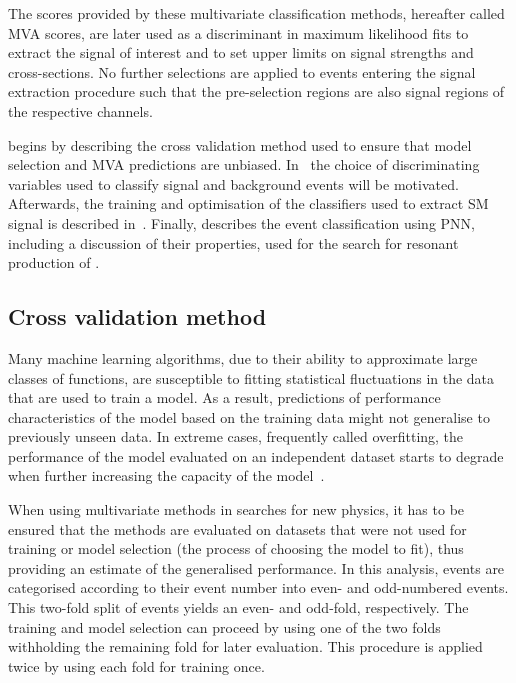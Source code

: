 The scores provided by these multivariate classification methods,
hereafter called MVA scores, are later used as a discriminant in
maximum likelihood fits to extract the signal of interest and to set
upper limits on signal strengths and cross-sections. No further
selections are applied to events entering the signal extraction
procedure such that the pre-selection regions are also signal regions
of the respective channels.

 begins by describing the cross
validation method used to ensure that model selection and MVA
predictions are unbiased.  In~
the choice of discriminating variables used to classify signal and
background events will be motivated. Afterwards, the training and
optimisation of the classifiers used to extract SM \HH signal is
described in~. Finally, 
describes the event classification using PNN, including a discussion
of their properties, used for the search for resonant production of
\HH.


\subsection{Cross validation method}
\label{sec:mva_crossvalidation}

Many machine learning algorithms, due to their ability to approximate
large classes of functions, are susceptible to fitting statistical
fluctuations in the data that are used to train a model. As a result,
predictions of performance characteristics of the model based on the
training data might not generalise to previously unseen data. In
extreme cases, frequently called overfitting, the performance of the
model evaluated on an independent dataset starts to degrade when
further increasing the capacity of the model~\cite{hastie09}.

When using multivariate methods in searches for new physics, it has to
be ensured that the methods are evaluated on datasets that were not
used for training or model selection (the process of choosing the
model to fit), thus providing an estimate of the generalised
performance. In this analysis, events are categorised according to
their event number into even- and odd-numbered events. This two-fold
split of events yields an even- and odd-fold, respectively. The
training and model selection can proceed by using one of the two folds
withholding the remaining fold for later evaluation. This procedure is
applied twice by using each fold for training once.

